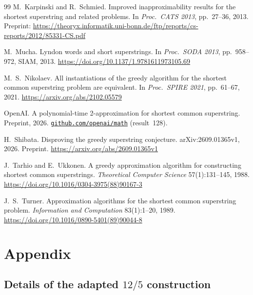\documentclass[11pt,a4paper]{article}   %
\theoremstyle{compact}
\theoremstyle{compactdef}
\begin{document}
{\begin{thebibliography}{99}
 M.~Karpinski and R.~Schmied.
  Improved inapproximability results for the shortest superstring and
  related problems. In \emph{Proc.\ CATS 2013}, pp.~27--36, 2013.
  Preprint: \url{https://theoryx.informatik.uni-bonn.de/ftp/reports/cs-reports/2012/85331-CS.pdf}

 M.~Mucha.
  Lyndon words and short superstrings.
  In \emph{Proc.\ SODA 2013}, pp.~958--972, SIAM, 2013.
  \url{https://doi.org/10.1137/1.9781611973105.69}

 M.~S.~Nikolaev.
  All instantiations of the greedy algorithm for the shortest common
  superstring problem are equivalent.
  In \emph{Proc.\ SPIRE 2021}, pp.~61--67, 2021.
  \url{https://arxiv.org/abs/2102.05579}

 OpenAI.
  A polynomial-time 2-approximation for shortest common superstring.
  Preprint, 2026.
  \href{https://github.com/openai/math/blob/main/preprints/A-Polynomial-Time-2-Approximation-for-Shortest-Common-Superstring-September-24-2026/paper.pdf}{\nolinkurl{github.com/openai/math}} (result~128).

 H.~Shibata.
  Disproving the greedy superstring conjecture.
  arXiv:2609.01365v1, 2026. Preprint.
  \url{https://arxiv.org/abs/2609.01365v1}

 J.~Tarhio and E.~Ukkonen.
  A greedy approximation algorithm for constructing shortest common
  superstrings. \emph{Theoretical Computer Science} 57(1):131--145, 1988.
  \url{https://doi.org/10.1016/0304-3975(88)90167-3}

 J.~S.~Turner.
  Approximation algorithms for the shortest common superstring problem.
  \emph{Information and Computation} 83(1):1--20, 1989.
  \url{https://doi.org/10.1016/0890-5401(89)90044-8}
\end{thebibliography}
}




\clearpage
\appendix
\section*{Appendix}
\renewcommand{\thesubsection}{\Alph{subsection}}

\subsection{Details of the adapted \texorpdfstring{$12/5$}{12/5} construction}\label{app:shibata}
\end{document}
